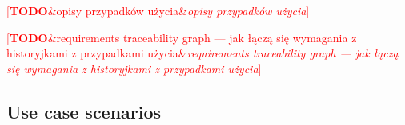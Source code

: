 \documentclass[english,engineering]{wizthesis}
\newcommand{\todo}[1]{%
  \textcolor{red}{[\textbf{TODO}\ifx&#1&{}\else{ }\fi\emph{#1}]}%
}
\begin{document}
\todo{opisy przypadków użycia}


\todo{requirements traceability graph --- jak łączą się wymagania z historyjkami
z przypadkami użycia}







\subsection{Use case scenarios}
\end{document}
